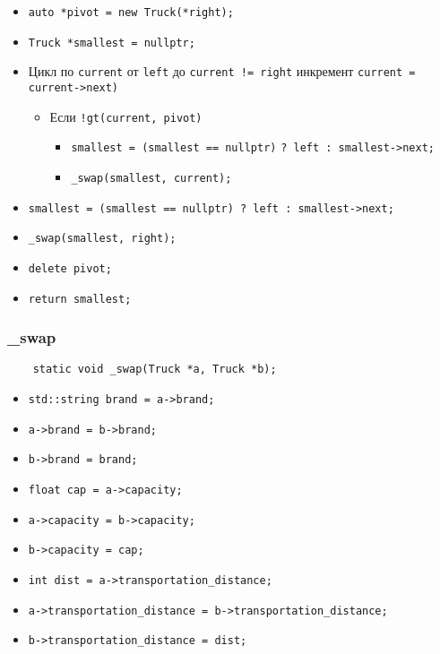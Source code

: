 \begin{itemize}
	\item \verb|auto *pivot = new Truck(*right);|
    \item \verb|Truck *smallest = nullptr;|
	\item Цикл по \verb|current| от \verb|left| до \verb|current != right| инкремент \verb|current = current->next)|
		\begin{itemize}
			\item Если \verb|!gt(current, pivot)|
				\begin{itemize}
					\item \verb|smallest = (smallest == nullptr)|
					\verb|? left : smallest->next;|
					\item \verb|_swap(smallest, current);|
				\end{itemize}
		\end{itemize}
    \item \verb|smallest = (smallest == nullptr) ? left : smallest->next;|
    \item \verb|_swap(smallest, right);|
    \item \verb|delete pivot;|
    \item \verb|return smallest;|
\end{itemize}



\subsubsection*{_swap}

\begin{lstlisting}
    static void _swap(Truck *a, Truck *b);
\end{lstlisting}

\begin{itemize}
	\item \verb|std::string brand = a->brand;|
    \item \verb|a->brand = b->brand;|
    \item \verb|b->brand = brand;|
    \item \verb|float cap = a->capacity;|
    \item \verb|a->capacity = b->capacity;|
    \item \verb|b->capacity = cap;|
    \item \verb|int dist = a->transportation_distance;|
    \item \verb|a->transportation_distance = b->transportation_distance;|
    \item \verb|b->transportation_distance = dist;|
\end{itemize}



